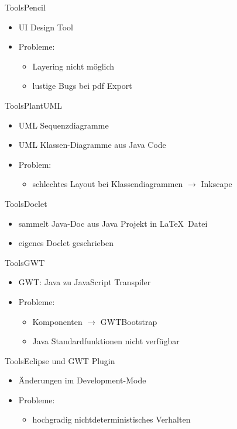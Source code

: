 \documentclass[10pt]{beamer}
\begin{document}
\begin{frame}{Tools}{Pencil}
	\begin{itemize}
		\item UI Design Tool
		\item Probleme:
			\begin{itemize}
				\item Layering nicht möglich
				\item lustige Bugs bei pdf Export
			\end{itemize} 
	\end{itemize}
\end{frame}

\begin{frame}{Tools}{PlantUML}
	\begin{itemize}
		\item UML Sequenzdiagramme
		\item UML Klassen-Diagramme aus Java Code
		\item Problem: 
			\begin{itemize}
				\item schlechtes Layout bei Klassendiagrammen $\rightarrow$ Inkscape
			\end{itemize}
	\end{itemize}
\end{frame}

\begin{frame}{Tools}{Doclet}
	\begin{itemize}
		\item sammelt Java-Doc aus Java Projekt in \LaTeX \ Datei
		\item eigenes Doclet geschrieben
	\end{itemize}
\end{frame}

\begin{frame}{Tools}{GWT}
	\begin{itemize}
		\item GWT: Java zu JavaScript Transpiler 
		\item Probleme: 
		\begin{itemize}
			\item Komponenten $\rightarrow$ GWTBootstrap
			\item Java Standardfunktionen nicht verfügbar
		\end{itemize}
	\end{itemize}
\end{frame}

\begin{frame}{Tools}{Eclipse und GWT Plugin}
	\begin{itemize}
		\item Änderungen im Development-Mode  
		\item Probleme:
		\begin{itemize}
			\item hochgradig nichtdeterministisches Verhalten
		\end{itemize}
	\end{itemize}
\end{frame}
\end{document}
